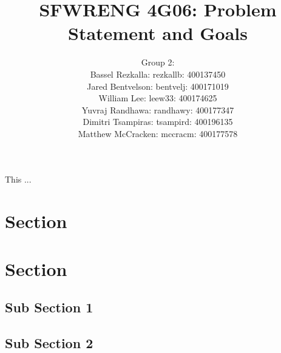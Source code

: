 \documentclass[12pt]{article}
\title{SFWRENG 4G06: Problem Statement and Goals}
\author{Group 2: \\ Bassel Rezkalla: rezkallb: 400137450 \\ Jared Bentvelson: bentvelj: 400171019 \\ William Lee: leew33: 400174625 \\ Yuvraj Randhawa: randhawy: 400177347 \\ Dimitri Tsampiras: tsampird: 400196135 \\ Matthew McCracken: mccracm: 400177578}
\begin{document}
	
	
	
	\maketitle
	
	\noindent This ...
	
	\section {Section}
	
	\section {Section}
	
	
	\subsection{Sub Section 1}
	
	
	\subsection{Sub Section 2}
	

	
\end{document}
